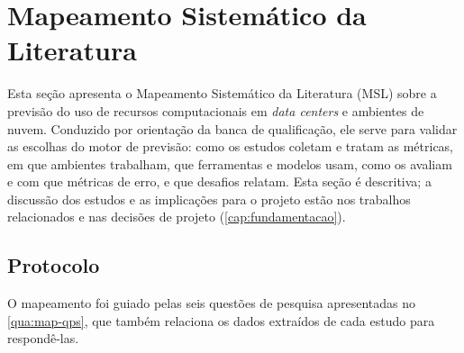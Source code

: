 
\section{Mapeamento Sistemático da Literatura}
\label{sec:mapeamento}

Esta seção apresenta o Mapeamento Sistemático da Literatura (MSL) sobre a previsão do uso de recursos computacionais em \textit{data centers} e ambientes de nuvem. Conduzido por orientação da banca de qualificação, ele serve para validar as escolhas do motor de previsão: como os estudos coletam e tratam as métricas, em que ambientes trabalham, que ferramentas e modelos usam, como os avaliam e com que métricas de erro, e que desafios relatam. Esta seção é descritiva; a discussão dos estudos e as implicações para o projeto estão nos trabalhos relacionados e nas decisões de projeto (\autoref{cap:fundamentacao}).

\subsection{Protocolo}
\label{subsec:map-protocolo}

O mapeamento foi guiado pelas seis questões de pesquisa apresentadas no \autoref{qua:map-qps}, que também relaciona os dados extraídos de cada estudo para respondê-las.


